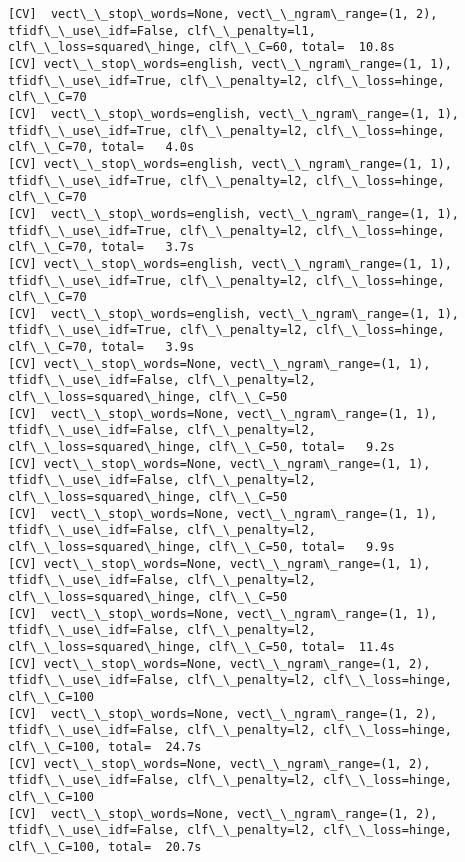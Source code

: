 \documentclass[11pt]{article}
\begin{document}
    \begin{Verbatim}[commandchars=\\\{\}]
[CV]  vect\_\_stop\_words=None, vect\_\_ngram\_range=(1, 2), tfidf\_\_use\_idf=False, clf\_\_penalty=l1, clf\_\_loss=squared\_hinge, clf\_\_C=60, total=  10.8s
[CV] vect\_\_stop\_words=english, vect\_\_ngram\_range=(1, 1), tfidf\_\_use\_idf=True, clf\_\_penalty=l2, clf\_\_loss=hinge, clf\_\_C=70 
[CV]  vect\_\_stop\_words=english, vect\_\_ngram\_range=(1, 1), tfidf\_\_use\_idf=True, clf\_\_penalty=l2, clf\_\_loss=hinge, clf\_\_C=70, total=   4.0s
[CV] vect\_\_stop\_words=english, vect\_\_ngram\_range=(1, 1), tfidf\_\_use\_idf=True, clf\_\_penalty=l2, clf\_\_loss=hinge, clf\_\_C=70 
[CV]  vect\_\_stop\_words=english, vect\_\_ngram\_range=(1, 1), tfidf\_\_use\_idf=True, clf\_\_penalty=l2, clf\_\_loss=hinge, clf\_\_C=70, total=   3.7s
[CV] vect\_\_stop\_words=english, vect\_\_ngram\_range=(1, 1), tfidf\_\_use\_idf=True, clf\_\_penalty=l2, clf\_\_loss=hinge, clf\_\_C=70 
[CV]  vect\_\_stop\_words=english, vect\_\_ngram\_range=(1, 1), tfidf\_\_use\_idf=True, clf\_\_penalty=l2, clf\_\_loss=hinge, clf\_\_C=70, total=   3.9s
[CV] vect\_\_stop\_words=None, vect\_\_ngram\_range=(1, 1), tfidf\_\_use\_idf=False, clf\_\_penalty=l2, clf\_\_loss=squared\_hinge, clf\_\_C=50 
[CV]  vect\_\_stop\_words=None, vect\_\_ngram\_range=(1, 1), tfidf\_\_use\_idf=False, clf\_\_penalty=l2, clf\_\_loss=squared\_hinge, clf\_\_C=50, total=   9.2s
[CV] vect\_\_stop\_words=None, vect\_\_ngram\_range=(1, 1), tfidf\_\_use\_idf=False, clf\_\_penalty=l2, clf\_\_loss=squared\_hinge, clf\_\_C=50 
[CV]  vect\_\_stop\_words=None, vect\_\_ngram\_range=(1, 1), tfidf\_\_use\_idf=False, clf\_\_penalty=l2, clf\_\_loss=squared\_hinge, clf\_\_C=50, total=   9.9s
[CV] vect\_\_stop\_words=None, vect\_\_ngram\_range=(1, 1), tfidf\_\_use\_idf=False, clf\_\_penalty=l2, clf\_\_loss=squared\_hinge, clf\_\_C=50 
[CV]  vect\_\_stop\_words=None, vect\_\_ngram\_range=(1, 1), tfidf\_\_use\_idf=False, clf\_\_penalty=l2, clf\_\_loss=squared\_hinge, clf\_\_C=50, total=  11.4s
[CV] vect\_\_stop\_words=None, vect\_\_ngram\_range=(1, 2), tfidf\_\_use\_idf=False, clf\_\_penalty=l2, clf\_\_loss=hinge, clf\_\_C=100 
[CV]  vect\_\_stop\_words=None, vect\_\_ngram\_range=(1, 2), tfidf\_\_use\_idf=False, clf\_\_penalty=l2, clf\_\_loss=hinge, clf\_\_C=100, total=  24.7s
[CV] vect\_\_stop\_words=None, vect\_\_ngram\_range=(1, 2), tfidf\_\_use\_idf=False, clf\_\_penalty=l2, clf\_\_loss=hinge, clf\_\_C=100 
[CV]  vect\_\_stop\_words=None, vect\_\_ngram\_range=(1, 2), tfidf\_\_use\_idf=False, clf\_\_penalty=l2, clf\_\_loss=hinge, clf\_\_C=100, total=  20.7s

\end{Verbatim}
\end{document}
